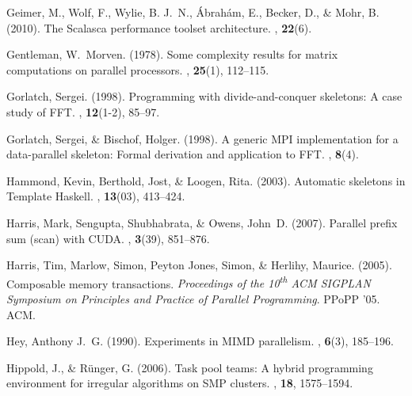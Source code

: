 \documentclass{jfp1}
\DeclareRobustCommand{\xth}{\textsuperscript{th}\xspace}
\DeclareRobustCommand{\xth}{\textsuperscript{th}\xspace}
\begin{document}
\begin{thebibliography}{}
Geimer, M., Wolf, F., Wylie, B. J.~N., {\'A}brah{\'a}m, E., Becker, D., \&
  Mohr, B. (2010).
\newblock The {Scalasca} performance toolset architecture.
, {\bf
  22}(6).

Gentleman, W.~Morven. (1978).
\newblock Some complexity results for matrix computations on parallel
  processors.
, {\bf 25}(1), 112--115.

Gorlatch, Sergei. (1998).
\newblock Programming with divide-and-conquer skeletons: A case study of {FFT}.
, {\bf 12}(1-2), 85--97.

Gorlatch, Sergei, \& Bischof, Holger. (1998).
\newblock A generic {MPI} implementation for a data-parallel skeleton: Formal
  derivation and application to {FFT}.
, {\bf 8}(4).

Hammond, Kevin, Berthold, Jost, \& Loogen, Rita. (2003).
\newblock Automatic skeletons in {Template} {Haskell}.
, {\bf 13}(03), 413--424.

Harris, Mark, Sengupta, Shubhabrata, \& Owens, John~D. (2007).
\newblock Parallel prefix sum (scan) with {CUDA}.
, {\bf 3}(39), 851--876.

Harris, Tim, Marlow, Simon, {Peyton Jones}, Simon, \& Herlihy, Maurice. (2005).
\newblock Composable memory transactions.
 {\em Proceedings of the 10\xth ACM SIGPLAN
  Symposium on Principles and Practice of Parallel Programming}.
\newblock PPoPP '05.
\newblock ACM.

Hey, Anthony J.~G. (1990).
\newblock Experiments in {MIMD} parallelism.
, {\bf 6}(3), 185--196.

Hippold, J., \& R{\"u}nger, G. (2006).
\newblock Task pool teams: A hybrid programming environment for irregular
  algorithms on {SMP} clusters.
, {\bf 18},
  1575--1594.


\end{thebibliography}
\end{document}
